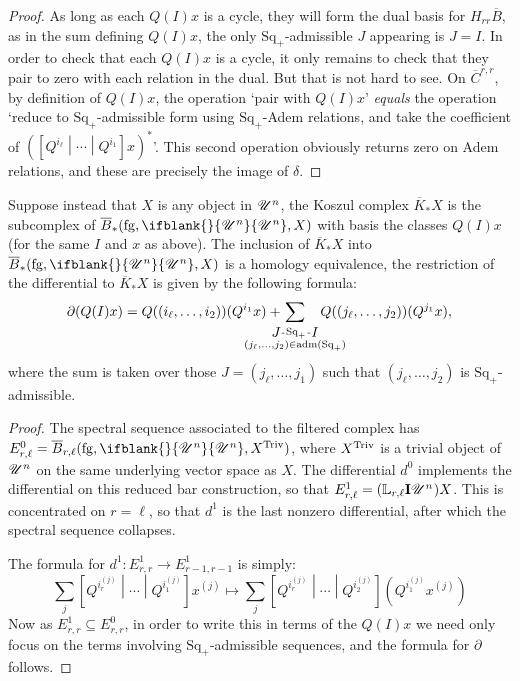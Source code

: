 \documentclass[11pt]{article}
\makeatletter
\newcommand{\nontop}[1]{\scrU^{#1}}%
\newcommand{\produces}[3]{{#1}{#3}{#2}}
\newcommand{\admis}[1]{\mathrm{adm}(#1)}%
\newcommand{\Ind}[2][]{\mathbf{I}{#2}_{#1}}%
\newcommand{\forget}{\mathrm{fg}}
\newcommand{\Fr}[2][]{\ifblank{#1}{#2}{#2_{#1}}}
\newcommand{\derived}{\mathbb{L}}
\renewcommand{\Q}{Q}
\newcommand{\SqShift}{\Sq_{+}}
\newcommand{\Sq}{\mathrm{Sq}}
\renewcommand{\produces}[3]{
{
\def\labelstyle{\scriptstyle}
\xymatrix@C=2em@1{
{#1}
\ar@{-}[r]|-{{\,#3\,}}
&%
{#2}%
}}}
\makeatother
\begin{document}
\begin{KoszulComplexes2plus}
\begin{proof}
As long as each $\Q(I)x$ is a cycle, they will form the dual basis for $H_{rr}\overline{B}$, as in the sum defining $\Q(I)x$, the only $\SqShift$-admissible $J$ appearing is $J=I$. In order to check that each $\Q(I)x$ is a cycle, it only remains to check that they pair to zero with each relation in the dual. But that is not hard to see. On $\overline{C}^{r,r}$, by definition of $\Q(I)x$, the operation `pair with $\Q(I)x$' \emph{equals} the operation `reduce to $\SqShift$-admissible form using $\SqShift$-Adem relations, and take the coefficient of $(\left[\Q^{i_\ell}\middle|\cdots\middle|\Q^{i_1} \right]x)^*$'. This second operation obviously returns zero on Adem relations, and these are precisely the image of $\delta$.
\end{proof}
\begin{prop*}
Suppose instead that $X$ is any object in $\nontop{n}$, the Koszul complex $\overline{K}_*X$ is the subcomplex of $\overline{B}_*(\forget,\Fr{\nontop{n}},X)$ with basis the classes $\Q(I)x$ (for the same $I$ and $x$ as above). The inclusion of $\overline{K}_*X$ into $\overline{B}_*(\forget,\Fr{\nontop{n}},X)$ is a homology equivalence, the restriction of the differential to $\overline{K}_*X$ is given by the following formula:
\[\partial(\Q(I)x)=\Q((i_{\ell},\ldots,i_2))(\Q^{i_1}x)+\!\!\!\!\!\!\!\!\!\!\!\!\!\!\!\!\!\sum_{\substack{\produces{J}{I}{\SqShift}\\(j_{\ell},\ldots,j_2)\in\admis{\SqShift}}}\!\!\!\!\!\!\!\!\!\!\!\! \Q((j_{\ell},\ldots,j_2))(\Q^{j_1}x),\]
where the sum is taken over those $J=(j_{\ell},\ldots,j_1)$ such that $(j_{\ell},\ldots,j_2)$ is $\SqShift$-admissible.
\end{prop*}
\begin{proof}
The spectral sequence associated to the filtered complex has $E^0_{r,\ell}=\overline{B}_{r,\ell}(\forget,\Fr{\nontop{n}},X^\textup{Triv})$, where $X^\textup{Triv}$ is a trivial object of $\nontop{n}$ on the same underlying vector space as $X$. The differential $d^0$ implements the differential on this reduced bar construction, so that $E^1_{r,\ell}=(\derived_{r,\ell}\Ind{\nontop{n}})X$. This is concentrated on $r=\ell$, so that $d^1$ is the last nonzero differential, after which the spectral sequence collapses.

The formula for $d^1:E^1_{r,r}\to E^1_{r-1,r-1}$ is simply:
\[\sum_j \left[\Q^{i_r^{(j)}}\middle|\cdots \middle|\Q^{i_1^{(j)}}\right]x^{(j)}
\mapsto
\sum_j \left[\Q^{i_r^{(j)}}\middle|\cdots \middle|\Q^{i_2^{(j)}}\right]\left(\Q^{i_1^{(j)}}x^{(j)}\right)\]
Now as $E^1_{r,r}\subseteq E^0_{r,r}$, in order to write this in terms of the $\Q(I)x$ we need only focus on the terms involving $\SqShift$-admissible sequences, and the formula for $\partial$ follows.
\end{proof}


\end{KoszulComplexes2plus}
\end{document}
